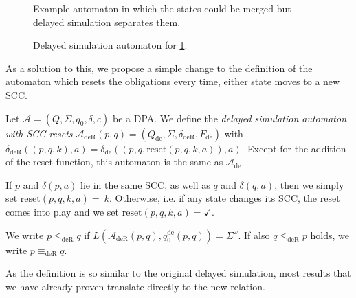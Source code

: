 \begin{figure}
\centering
{}
\caption{Example automaton in which the states could be merged but delayed simulation separates them.}
\label{fig:fritzwilke:reset_oblig_example}
\end{figure}

\begin{figure}
\centering
{}
\caption{Delayed simulation automaton for \ref{fig:fritzwilke:reset_oblig_example}.}
\label{fig:fritzwilke:reset_oblig_example_dea}
\end{figure}

As a solution to this, we propose a simple change to the definition of the automaton which resets the obligations every time, either state moves to a new SCC. 

\begin{defn}
	Let $\mathcal{A} = (Q, \Sigma, q_0, \delta, c)$ be a DPA. We define the \emph{delayed simulation automaton with SCC resets} $\mathcal{A}_\text{deR}(p, q) = (Q_\text{de}, \Sigma, \delta_\text{deR}, F_\text{de})$ with $\delta_\text{deR}((p, q, k), a) = \delta_\text{de}((p, q, \text{reset}(p, q, k, a)), a)$. Except for the addition of the reset function, this automaton is the same as $\mathcal{A}_\text{de}$.
	
	If $p$ and $\delta(p, a)$ lie in the same SCC, as well as $q$ and $\delta(q, a)$, then we simply set $\text{reset}(p, q, k, a) =~k$. Otherwise, i.e. if any state changes its SCC, the reset comes into play and we set $\text{reset}(p, q, k, a) = \checkmark$.
	
	We write $p \leq_\text{deR} q$ if $L(\mathcal{A}_\text{deR}(p, q), q_0^\text{de}(p, q)) = \Sigma^\omega$. If also $q \leq_\text{deR} p$ holds, we write $p \equiv_\text{deR} q$.
\end{defn}

As the definition is so similar to the original delayed simulation, most results that we have already proven translate directly to the new relation. 

